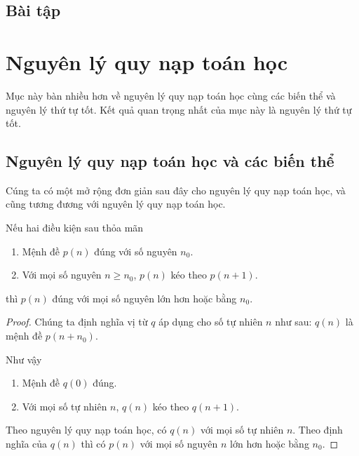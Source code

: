 \subsection{Bài tập}

\section{Nguyên lý quy nạp toán học}\label{section:principle-of-mathematical-induction}

Mục này bàn nhiều hơn về nguyên lý quy nạp toán học cùng các biến thể và nguyên lý thứ tự tốt. Kết quả quan trọng nhất của mục này là nguyên lý thứ tự tốt.

\subsection{Nguyên lý quy nạp toán học và các biến thể}

Cúng ta có một mở rộng đơn giản sau đây cho nguyên lý quy nạp toán học, và cũng tương đương với nguyên lý quy nạp toán học.

\begin{theorem}
    Nếu hai điều kiện sau thỏa mãn
    \begin{enumerate}[label={(\roman*)}]
        \item Mệnh đề $p(n)$ đúng với số nguyên $n_{0}$.
        \item Với mọi số nguyên $n\geq n_{0}$, $p(n)$ kéo theo $p(n + 1)$.
    \end{enumerate}

    thì $p(n)$ đúng với mọi số nguyên lớn hơn hoặc bằng $n_{0}$.
\end{theorem}

\begin{proof}
    Chúng ta định nghĩa vị từ $q$ áp dụng cho số tự nhiên $n$ như sau: $q(n)$ là mệnh đề $p(n + n_{0})$.

    Như vậy
    \begin{enumerate}[label={(\roman*)}]
        \item Mệnh đề $q(0)$ đúng.
        \item Với mọi số tự nhiên $n$, $q(n)$ kéo theo $q(n + 1)$.
    \end{enumerate}

    Theo nguyên lý quy nạp toán học, có $q(n)$ với mọi số tự nhiên $n$. Theo định nghĩa của $q(n)$ thì có $p(n)$ với mọi số nguyên $n$ lớn hơn hoặc bằng $n_{0}$.
\end{proof}

